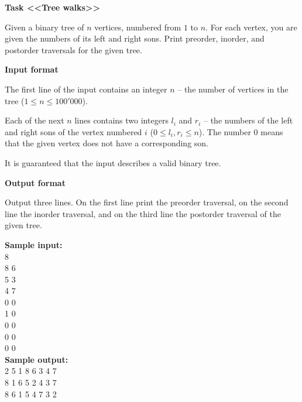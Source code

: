 \documentclass[a4paper]{article}
\begin{document}
\textbf{Task <<Tree walks>>}

\SPACE

Given a binary tree of $n$ vertices, numbered from $1$ to $n$. For each vertex, you are given the numbers of its left and right sons. Print preorder, inorder, and postorder traversals for the given tree.

\SPACE

\textbf{Input format}

The first line of the input contains an integer $n$ -- the number of vertices in the tree ($1 \le n \le 100'000$).

Each of the next $n$ lines contains two integers $l_i$ and $r_i$ -- the numbers of the left and right sons of the vertex numbered $i$ ($0 \le l_i, r_i \le n$). The number $0$ means that the given vertex does not have a corresponding son.

It is guaranteed that the input describes a valid binary tree.


\SPACE

\textbf{Output format}

Output three lines. On the first line print the preorder traversal, on the second line the inorder traversal, and on the third line the postorder traversal of the given tree.

\LINE

\noindent \textbf{Sample input:}\\
8\\
8 6\\
5 3\\
4 7\\
0 0\\
1 0\\
0 0\\
0 0\\
0 0\\


\noindent \textbf{Sample output:}\\
2 5 1 8 6 3 4 7\\
8 1 6 5 2 4 3 7\\
8 6 1 5 4 7 3 2\\
\end{document}
